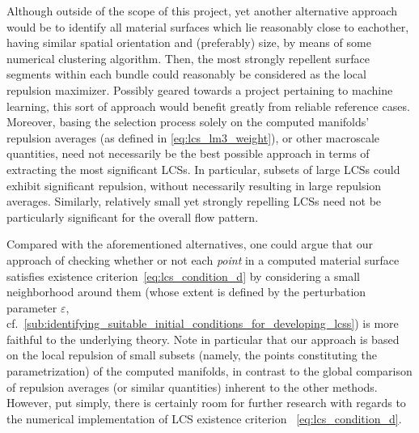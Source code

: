 Although outside of the scope of this project, yet another alternative
approach would be to identify all material surfaces which lie reasonably close
to eachother, having similar spatial orientation and (preferably) size, by
means of some numerical clustering algorithm. Then, the most strongly repellent
surface segments within each bundle could reasonably be considered as the local
repulsion maximizer. Possibly geared towards a project pertaining to machine
learning, this sort of approach would benefit greatly from reliable reference
cases. Moreover, basing the selection process solely on the computed manifolds'
repulsion averages (as defined in \cref{eq:lcs_lm3_weight}), or other
macroscale quantities, need not necessarily be the best possible approach in
terms of extracting the most significant LCSs. In particular, subsets of large
LCSs could exhibit significant repulsion, without necessarily resulting in
large repulsion averages. Similarly, relatively small yet strongly repelling
LCSs need not be particularly significant for the overall flow pattern.

Compared with the aforementioned alternatives, one could argue that our
approach of checking whether or not each \emph{point} in a computed material
surface satisfies existence criterion~\eqref{eq:lcs_condition_d} by considering
a small neighborhood around them (whose extent is defined by the perturbation
parameter $\varepsilon$, cf.\
\cref{sub:identifying_suitable_initial_conditions_for_developing_lcss}) is more
faithful to the underlying theory. Note in particular that our approach is
based on the local repulsion of small subsets (namely, the points constituting
the parametrization) of the computed manifolds, in contrast to the global
comparison of repulsion averages (or similar quantities) inherent to the other
methods. However, put simply, there is certainly room for further research with
regards to the numerical implementation of LCS existence criterion~%
\eqref{eq:lcs_condition_d}.

